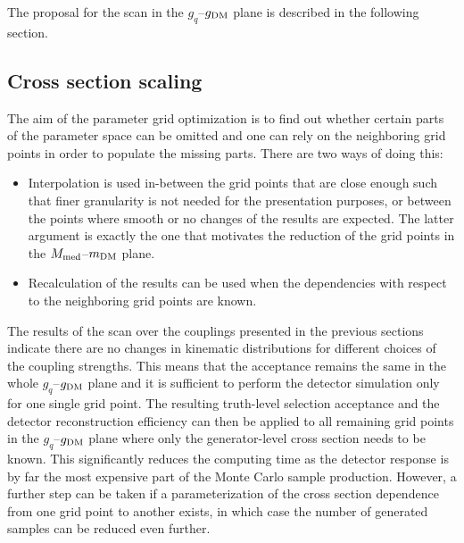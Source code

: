 The proposal for the scan in the $g_q$--$g_{\rm{DM}}$ plane is described in the following section.






\subsection{Cross section scaling}
\label{sec:monojet_scaling}

The aim of the parameter grid optimization is to find out whether certain parts of the parameter space can be omitted and one can rely on the neighboring grid points in order to populate the missing parts. There are two ways of doing this:
\begin{itemize}
\item Interpolation is used in-between the grid points that are close enough such that finer granularity is not needed for the presentation purposes, or between the points where smooth or no changes of the results are expected. The latter argument is exactly the one that motivates the reduction of the grid points in the $M_{\rm{med}}$--$m_{\rm{DM}}$ plane.\\
\item Recalculation of the results can be used when the dependencies with respect to the neighboring grid points are known.\\
\end{itemize}

The results of the scan over the couplings presented in the previous sections indicate there are no changes in kinematic distributions for different choices of the coupling strengths. This means that the acceptance remains the same in the whole $g_q$--$g_{\rm{DM}}$ plane and it is sufficient to perform the detector simulation only for one single grid point. The resulting truth-level selection acceptance and the detector reconstruction efficiency can then be applied to all remaining grid points in the $g_q$--$g_{\rm{DM}}$ plane where only the generator-level cross section needs to be known. This significantly reduces the computing time as the detector response is by far the most expensive part of the Monte Carlo sample production. However, a further step can be taken if a parameterization of the cross section dependence from one grid point to another exists, in which case the number of generated samples can be reduced even further.

